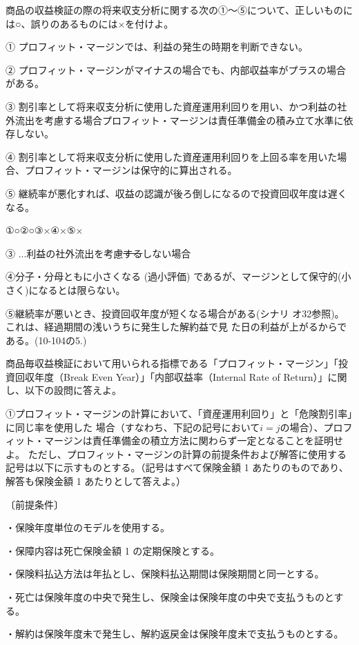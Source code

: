 \documentclass[report,gutter=10mm,fore-edge=10mm,uplatex,dvipdfmx]{jlreq}
\begin{document}
商品の収益検証の際の将来収支分析に関する次の①～⑤について、正しいものには○、誤りのあるものには×を付けよ。

① プロフィット・マージンでは、利益の発生の時期を判断できない。

② プロフィット・マージンがマイナスの場合でも、内部収益率がプラスの場合がある。

③ 割引率として将来収支分析に使用した資産運用利回りを用い、かつ利益の社外流出を考慮する場合プロフィット・マージンは責任準備金の積み立て水準に依存しない。

④ 割引率として将来収支分析に使用した資産運用利回りを上回る率を用いた場合、プロフィット・マージンは保守的に算出される。

⑤ 継続率が悪化すれば、収益の認識が後ろ倒しになるので投資回収年度は遅くなる。

\answer{}
①○②○③×④×⑤×

③ ...利益の社外流出を考慮\sout{する}しない場合

④分子・分母ともに小さくなる (過小評価) であるが、マージンとして保守的(小さく)になるとは限らない。

⑤継続率が悪いとき、投資回収年度が短くなる場合がある(シナリ
オ32参照)。これは、経過期間の浅いうちに発生した解約益で見
た日の利益が上がるからである。(10-104の5.)

商品毎収益検証において用いられる指標である「プロフィット・マージン」「投資回収年度（Break
Even Year）」「内部収益率（Internal Rate of Return）」に関し、以下の設問に答えよ。

①プロフィット・マージンの計算において、「資産運用利回り」と「危険割引率」に同じ率を使用した
場合（すなわち、下記の記号において$i=j$の場合）、プロフィット・マージンは責任準備金の積立方法に関わらず一定となることを証明せよ。
ただし、プロフィット・マージンの計算の前提条件および解答に使用する記号は以下に示すものとする。（記号はすべて保険金額 1 あたりのものであり、解答も保険金額 1 あたりとして答えよ。）

〔前提条件〕

・保険年度単位のモデルを使用する。

・保障内容は死亡保険金額 1 の定期保険とする。

・保険料払込方法は年払とし、保険料払込期間は保険期間と同一とする。

・死亡は保険年度の中央で発生し、保険金は保険年度の中央で支払うものとする。

・解約は保険年度未で発生し、解約返戻金は保険年度未で支払うものとする。
\end{document}
